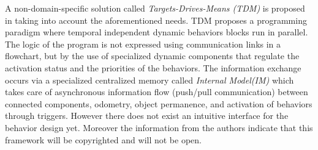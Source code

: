 {%
A non-domain-specific solution called \emph{Targets-Drives-Means (TDM)} is proposed in \cite{berenz2014targets} taking into account the aforementioned needs. TDM proposes a programming paradigm where temporal independent dynamic behaviors blocks run in parallel. The logic of the program is not expressed using communication links in a flowchart, but by the use of specialized dynamic components that regulate the activation status and the priorities of the behaviors. The information exchange occurs via a specialized centralized memory called \emph{Internal Model(IM)} which takes care of asynchronous information flow (push/pull communication) between connected components, odometry, object permanence, and activation of behaviors through triggers. However there does not exist an intuitive interface for the behavior design yet. Moreover the information from the authors indicate that this framework will be copyrighted and will not be open.

}
